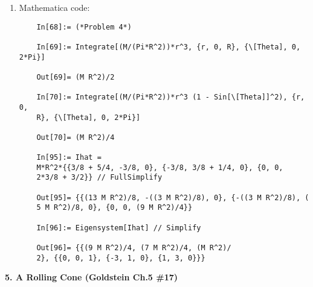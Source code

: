 \documentclass{article}
\theoremstyle{definition}
\begin{document}
\begin{enumerate}[label=(\alph*)]
	\item Mathematica code:
	\begin{lstlisting}
	In[68]:= (*Problem 4*)
	
	In[69]:= Integrate[(M/(Pi*R^2))*r^3, {r, 0, R}, {\[Theta], 0, 2*Pi}]
	
	Out[69]= (M R^2)/2
	
	In[70]:= Integrate[(M/(Pi*R^2))*r^3 (1 - Sin[\[Theta]]^2), {r, 0, 
	R}, {\[Theta], 0, 2*Pi}]
	
	Out[70]= (M R^2)/4
	
	In[95]:= Ihat = 
	M*R^2*{{3/8 + 5/4, -3/8, 0}, {-3/8, 3/8 + 1/4, 0}, {0, 0, 
	2*3/8 + 3/2}} // FullSimplify
	
	Out[95]= {{(13 M R^2)/8, -((3 M R^2)/8), 0}, {-((3 M R^2)/8), (
	5 M R^2)/8, 0}, {0, 0, (9 M R^2)/4}}
	
	In[96]:= Eigensystem[Ihat] // Simplify
	
	Out[96]= {{(9 M R^2)/4, (7 M R^2)/4, (M R^2)/
	2}, {{0, 0, 1}, {-3, 1, 0}, {1, 3, 0}}}
	\end{lstlisting}
\end{enumerate}






\noindent \textbf{5. A Rolling Cone (Goldstein Ch.5 \#17)}
\end{document}
